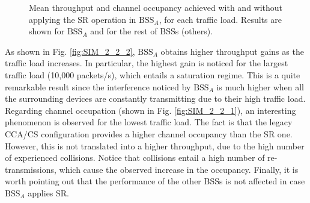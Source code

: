 \documentclass{ieeeaccess}
\begin{document}
\begin{figure}[ht!]
	\centering		
	\caption{Mean throughput and channel occupancy achieved with and without applying the SR operation in $\text{BSS}_A$, for each traffic load. Results are shown for $\text{BSS}_A$ and for the rest of BSSs (others).}
	\label{fig:SIM_2_2}
\end{figure}

As shown in Fig. \ref{fig:SIM_2_2_2}, $\text{BSS}_A$ obtains higher throughput gains as the traffic load increases. In particular, the highest gain is noticed for the largest traffic load (10,000 packets/s), which entails a saturation regime. This is a quite remarkable result since the interference noticed by $\text{BSS}_A$ is much higher when all the surrounding devices are constantly transmitting due to their high traffic load. Regarding channel occupation (shown in Fig. \ref{fig:SIM_2_2_1}), an interesting phenomenon is observed for the lowest traffic load. The fact is that the legacy CCA/CS configuration provides a higher channel occupancy than the SR one. However, this is not translated into a higher throughput, due to the high number of experienced collisions. Notice that collisions entail a high number of re-transmissions, which cause the observed increase in the occupancy. Finally, it is worth pointing out that the performance of the other BSSs is not affected in case $\text{BSS}_A$ applies SR.
\end{document}
